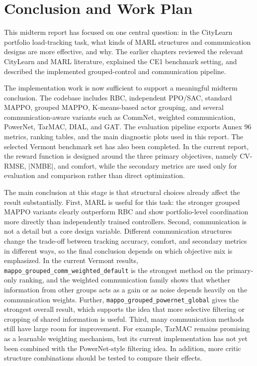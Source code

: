 ﻿\chapter{Conclusion and Work Plan}\label{ch:concl}

This midterm report has focused on one central question: in the CityLearn
portfolio load-tracking task, what kinds of MARL structures and communication
designs are more effective, and why. The earlier chapters reviewed the relevant
CityLearn and MARL literature, explained the CE1 benchmark setting, and
described the implemented grouped-control and communication pipeline.

The implementation work is now sufficient to support a meaningful midterm
conclusion. The codebase includes RBC, independent PPO/SAC, standard MAPPO,
grouped MAPPO, K-means-based actor grouping, and several communication-aware
variants such as CommNet, weighted communication, PowerNet, TarMAC, DIAL, and
GAT. The evaluation pipeline exports Annex 96 metrics, ranking tables, and the
main diagnostic plots used in this report. The selected Vermont benchmark set
has also been completed. In the current report, the reward function is designed
around the three primary objectives, namely CV-RMSE, $|$NMBE$|$, and comfort,
while the secondary metrics are used only for evaluation and comparison rather
than direct optimization.

The main conclusion at this stage is that structural choices already affect the
result substantially. First, MARL is useful for this task:
the stronger grouped MAPPO variants clearly outperform RBC and show
portfolio-level coordination more directly than independently trained
controllers. Second, communication is
not a detail but a core design variable. Different communication structures
change the trade-off between tracking accuracy, comfort, and secondary metrics
in different ways, so the final conclusion depends on which objective mix is
emphasized. In the current Vermont results,
\texttt{mappo\_grouped\_comm\_weighted\_default} is the
strongest method on the primary-only ranking, and the weighted communication
family shows that whether information from other groups acts as a gain or as
noise depends heavily on the communication weights. Further,
\texttt{mappo\_grouped\_powernet\_global} gives the strongest
overall result, which supports the idea that more selective filtering or
cropping of shared information is useful. Third, many communication methods
still have large room for improvement. For example, TarMAC remains promising as
a learnable weighting mechanism, but its current implementation has not yet
been combined with the PowerNet-style filtering idea. In addition, more critic
structure combinations should be tested to compare their effects.

